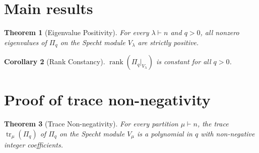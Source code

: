 \documentclass[11pt]{article}
\newtheorem{theorem}{Theorem}
\newtheorem{corollary}[theorem]{Corollary}
\theoremstyle{definition}
\theoremstyle{remark}
\begin{document}
\section{Main results}

\begin{theorem}[Eigenvalue Positivity]\label{thm:main}
For every $\lambda \vdash n$ and $q > 0$, all nonzero eigenvalues of\/
$\Pi_q$ on the Specht module $V_\lambda$ are strictly positive.
\end{theorem}

\begin{corollary}[Rank Constancy]\label{cor:rank}
$\operatorname{rank}(\Pi_q|_{V_\lambda})$ is constant for all $q > 0$.
\end{corollary}

\section{Proof of trace non-negativity}

\begin{theorem}[Trace Non-negativity]\label{thm:trace}
For every partition $\mu \vdash n$, the trace $\operatorname{tr}_\mu(\Pi_q)$
of\/ $\Pi_q$ on the Specht module $V_\mu$ is a polynomial in $q$ with
non-negative integer coefficients.
\end{theorem}
\end{document}
